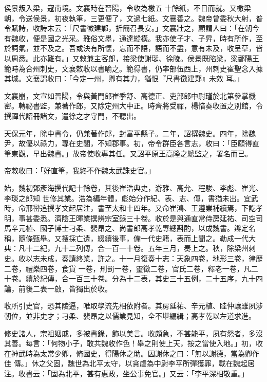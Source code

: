 \begin{pinyinscope}
 侯景叛入梁，寇南境。文襄時在晉陽，令收為檄五
 十餘紙，不日而就。又檄梁朝，令送侯景，初夜執筆，三更便了，文過七紙。文襄善之。魏帝曾委秋大射，普令賦詩，收詩末云：「尺書徵建鄴，折簡召長安。」文襄壯之，顧謂人曰：「在朝今有魏收，便是國之光采。雅俗文墨，通達縱橫。我亦使子才、子昇，時有所作，至於詞氣，並不及之。吾或決有所懷，忘而不語，語而不盡，意有未及，收呈草，皆以周悉。此亦難有。」又敕兼主客郎，接梁使謝珽、徐陵。侯景既陷梁，梁鄱陽王範時為合州刺史，文襄敕收以書喻之。範得書，仍率部伍西上，州刺史崔聖念入據其城。文襄謂收曰：「今定一州，卿有其力，猶恨『尺書徵建鄴』未效
 耳。」



 文襄崩，文宣如晉陽，令與黃門郎崔季舒、高德正、吏部郎中尉瑾於北第參掌機密。轉祕書監，兼著作郎，又除定州大中正。時齊將受禪，楊愔奏收置之別館，令撰禪代詔冊諸文，遣徐之才守門，不聽出。



 天保元年，除中書令，仍兼著作郎，封富平縣子。二年，詔撰魏史。四年，除魏尹，故優以祿力，專在史閣，不知郡事。初，帝令群臣各言志，收曰：「臣願得直筆東觀，早出魏書。」故帝使收專其任。又詔平原王高隆之總監之，署名而已。



 帝敕收曰：「好直筆，我終不作魏太武誅史官。」



 始，魏初鄧彥海撰代記十餘卷，其後崔浩典史，游雅、高允、程駿、李彪、崔光、李琰之郎知
 世修其業。浩為編年體，彪始分作紀、表、志、傳，書猶未出。宜武時，命邢巒追撰孝文起居注，書至太和十四年。又命崔鴻、王遵業補續焉，下訖孝明，事甚委悉。濟陰王暉業撰辨宗室錄三十卷。收於是與通直常侍房延祐、司空司馬辛元植、國子博士刁柔、裴昂之、尚書郎高孝乾專總斟酌，以成魏書。辯定名稱，隨條甄舉。又搜採亡遺，綴續後事，備一代史籍，表而上聞之。勒成一代大典：凡十二紀，九十二列傳，合一百一十卷。五年三月，奏上之。秋，除梁州刺史。收以志未成，奏請終業，許之。十一月復奏十志：天象四卷，地形三卷，律歷二卷，禮樂四卷，食貨
 一卷，刑罰一卷，靈徵二卷，官氏二卷，釋老一卷，凡二十卷。續於紀傳，合一百三十卷。分為十二表，其史三十五例，二十五序，九十四論，前後二表一啟，皆獨出於收。



 收所引史官，恐其陵逼，唯取學流先相依附者。其房延祐、辛元植、眭仲讓雖夙涉朝位，並非史才；刁柔、裴昂之以儒業見知，全不堪編緝；高孝乾以左道求進。



 修史諸人，宗祖姻戚，多被書錄，飾以美言。收頗急，不甚能平，夙有怨者，多沒其善。每言：「何物小子，敢共魏收作色！舉之則使上天，按之當使入地。」初，收在神武時為太常少卿，脩國史，得陽休之助。因謝休之曰：「無以謝德，當為卿作佳
 傳。」休之父固，魏世為北平太守，以貪虐為中尉李平所彈獲罪，載在魏起居注。收書云：「固為北平，甚有惠政，坐公事免官。」又云：「李平深相敬重。」




\end{pinyinscope}
